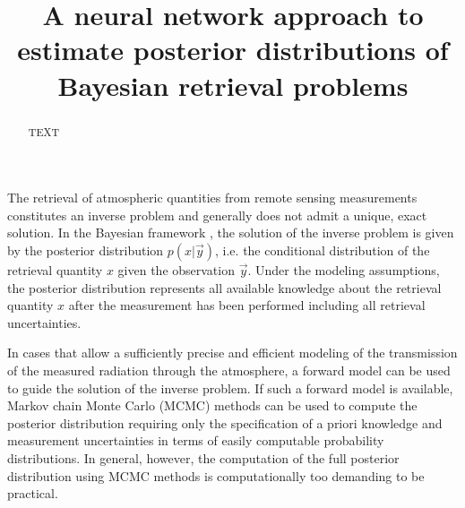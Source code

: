 \documentclass[journal abbreviation, manuscript]{copernicus}
\begin{document}
\title{A neural network approach to estimate posterior distributions of Bayesian retrieval problems}













\received{}
\pubdiscuss{} %
\revised{}
\accepted{}
\published{}




\maketitle



\begin{abstract}
TEXT
\end{abstract}




\introduction  %

The retrieval of atmospheric quantities from remote sensing measurements
constitutes an inverse problem and generally does not admit a unique, exact
solution. In the Bayesian framework \citep{rodgers}, the solution of the inverse
problem is given by the posterior distribution $p(x | \vec{y})$, i.e. the conditional
distribution of the retrieval quantity $x$ given the observation $\vec{y}$.
Under the modeling assumptions, the posterior distribution represents all
available knowledge about the retrieval quantity $x$ after the measurement has
been performed including all retrieval uncertainties.

In cases that allow a sufficiently precise and efficient modeling of the transmission
of the measured radiation through the atmosphere, a forward model can be used to guide the
solution of the inverse problem. If such a forward model is available, Markov chain
Monte Carlo (MCMC) methods can be used to compute the posterior distribution
requiring only the specification of a priori knowledge and measurement uncertainties
in terms of easily computable probability distributions. In general, however, the
computation of the full posterior distribution using MCMC methods is computationally
too demanding to be practical.
\end{document}

